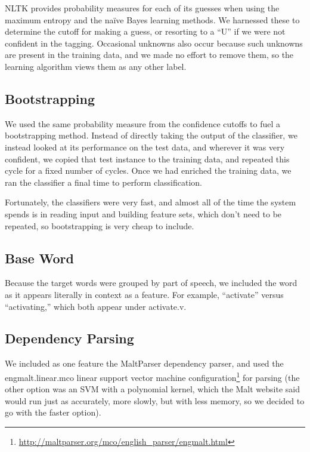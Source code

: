 \documentclass{article}
\newcommand{\naive}{na\"ive}
\begin{document}
NLTK provides probability measures for each of its guesses when using the
maximum entropy and the \naive{} Bayes learning methods.  We harnessed these to
determine the cutoff for making a guess, or resorting to a ``U'' if we were not
confident in the tagging.  Occasional unknowns also occur because such unknowns
are present in the training data, and we made no effort to remove them, so the
learning algorithm views them as any other label.


\subsection{Bootstrapping}

We used the same probability measure from the confidence cutoffs to fuel a
bootstrapping method.  Instead of directly taking the output of the classifier,
we instead looked at its performance on the test data, and wherever it was very
confident, we copied that test instance to the training data, and repeated this
cycle for a fixed number of cycles.  Once we had enriched the training data, we
ran the classifier a final time to perform classification.

Fortunately, the classifiers were very fast, and almost all of the time the
system spends is in reading input and building feature sets, which don't need
to be repeated, so bootstrapping is very cheap to include.



\subsection{Base Word}

Because the target words were grouped by part of speech, we included the word
as it appears literally in context as a feature.  For example, ``activate''
versus ``activating,'' which both appear under activate.v.

\subsection{Dependency Parsing}

We included as one feature the MaltParser dependency parser, and used the
engmalt.linear.mco linear support vector machine
configuration\footnote{\url{http://maltparser.org/mco/english_parser/engmalt.html}}
for parsing (the other option was an SVM with a polynomial kernel, which the
Malt website said would run just as accurately, more slowly, but with less
memory, so we decided to go with the faster option).
\end{document}
